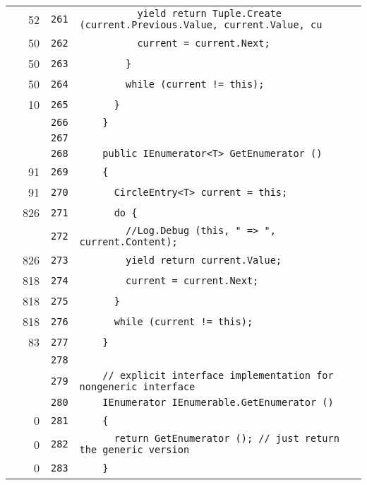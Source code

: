 \documentclass[a4paper,10pt]{article}
\begin{document}
\begin{longtable}[l]{lrrl}
\cellcolor{green} & 52 & \verb~261~ & \verb~          yield return Tuple.Create (current.Previous.Value, current.Value, cu~\\
\cellcolor{green} & 50 & \verb~262~ & \verb~          current = current.Next;~\\
\cellcolor{green} & 50 & \verb~263~ & \verb~        }~\\
\cellcolor{green} & 50 & \verb~264~ & \verb~        while (current != this);~\\
\cellcolor{green} & 10 & \verb~265~ & \verb~      }~\\
\cellcolor{gray} &  & \verb~266~ & \verb~    }~\\
\cellcolor{gray} &  & \verb~267~ & \verb~~\\
\cellcolor{gray} &  & \verb~268~ & \verb~    public IEnumerator<T> GetEnumerator ()~\\
\cellcolor{green} & 91 & \verb~269~ & \verb~    {~\\
\cellcolor{green} & 91 & \verb~270~ & \verb~      CircleEntry<T> current = this;~\\
\cellcolor{green} & 826 & \verb~271~ & \verb~      do {~\\
\cellcolor{gray} &  & \verb~272~ & \verb~        //Log.Debug (this, " => ", current.Content);~\\
\cellcolor{green} & 826 & \verb~273~ & \verb~        yield return current.Value;~\\
\cellcolor{green} & 818 & \verb~274~ & \verb~        current = current.Next;~\\
\cellcolor{green} & 818 & \verb~275~ & \verb~      }~\\
\cellcolor{green} & 818 & \verb~276~ & \verb~      while (current != this);~\\
\cellcolor{green} & 83 & \verb~277~ & \verb~    }~\\
\cellcolor{gray} &  & \verb~278~ & \verb~~\\
\cellcolor{gray} &  & \verb~279~ & \verb~    // explicit interface implementation for nongeneric interface~\\
\cellcolor{gray} &  & \verb~280~ & \verb~    IEnumerator IEnumerable.GetEnumerator ()~\\
\cellcolor{red} & 0 & \verb~281~ & \verb~    {~\\
\cellcolor{red} & 0 & \verb~282~ & \verb~      return GetEnumerator (); // just return the generic version~\\
\cellcolor{red} & 0 & \verb~283~ & \verb~    }~\\

\end{longtable}
\end{document}
